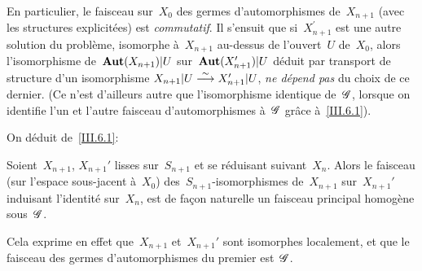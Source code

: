 En particulier, le faisceau sur~$X_0$ des germes d'automorphismes
de~$X_{n+1}$ (avec les structures explicit\'ees) est
\emph{commutatif}. Il s'ensuit que si~$X_{n+1}^\prime$ est une autre
solution du probl\`eme, isomorphe \`a~$X_{n+1}$ au-dessus de
l'ouvert~$U$ de~$X_0$, alors l'isomorphisme de~$\operatorname{\mathbf{Aut}}(X_{n+1})|U$
sur~$\operatorname{\mathbf{Aut}}(X_{n+1}^\prime)|U$ d\'eduit par transport de
structure d'un isomorphisme $X_{n+1}|U\overset{\sim}{\longrightarrow} X_{n+1}^\prime|U$,
\emph{ne dépend pas} du choix de ce dernier. (Ce n'est d'ailleurs
autre que l'isomorphisme identique de~$\cal{G}$, lorsque on identifie
l'un et l'autre faisceau d'automorphismes \`a~$\cal{G}$ gr\^ace
\`a~\ref{III.6.1}).

On d\'eduit de~\ref{III.6.1}:

\begin{corollaire}
\label{III.6.2}
Soient~$X_{n+1}$, $X_{n+1}'$ lisses sur~$S_{n+1}$ et \og se
r\'eduisant suivant~$X_n$\fg. Alors le faisceau (sur l'espace
sous-jacent \`a~$X_0$) des~$S_{n+1}$-isomorphismes de~$X_{n+1}$
sur~$X_{n+1}'$ induisant l'identit\'e sur~$X_n$, est de fa\c con
naturelle un faisceau principal homog\`ene sous~$\cal{G}$.
\end{corollaire}

Cela exprime en effet que~$X_{n+1}$ et~$X_{n+1}'$ sont isomorphes
localement, et que le faisceau des germes d'automorphismes du premier
est~$\cal{G}$.

